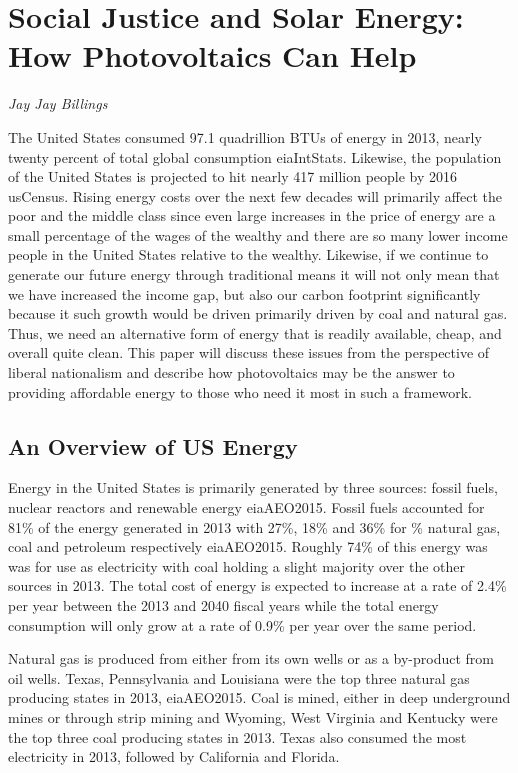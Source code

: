 \section{Social Justice and Solar Energy: How Photovoltaics Can Help}
\textit{Jay Jay Billings}

The United States consumed 97.1 quadrillion BTUs of energy in 2013, nearly 
twenty percent of total global consumption \cite{jay}{eiaIntStats}. Likewise, the 
population of the United States is projected to hit nearly 417 million people 
by 2016 \cite{jay}{usCensus}. Rising energy costs over the next few decades will 
primarily affect the poor and the middle class since even large increases in 
the price of energy are a small percentage of the wages of the wealthy and 
there are so many lower income people in the United States relative to the 
wealthy. Likewise, if we continue to generate our future energy through 
traditional means it will not only mean that we have increased the income gap, 
but also our carbon footprint significantly because it such growth would be 
driven primarily driven by coal and natural gas. Thus, we need an alternative 
form of energy that is readily available, cheap, and overall quite clean. This 
paper will discuss these issues from the perspective of liberal nationalism and 
describe how photovoltaics may be the answer to providing affordable energy to 
those who need it most in such a framework.

\subsection{An Overview of US Energy}

Energy in the United States is primarily generated by three sources: fossil 
fuels, nuclear reactors and renewable energy \cite{jay}{eiaAEO2015}. Fossil fuels 
accounted for 81\% of the energy generated in 2013 with 27\%, 18\% and 36\% for 
\% natural gas, coal and petroleum respectively \cite{jay}{eiaAEO2015}. Roughly 74\%
of this energy was was for use as electricity with coal holding a slight 
majority over the other sources in 2013. The total cost of energy is expected 
to increase at a rate of 2.4\% per year between the 2013 and 2040 fiscal years 
while the total energy consumption will only grow at a rate of 0.9\% per year 
over the same period.

Natural gas is produced from either from its own wells or as a by-product from 
oil wells. Texas, Pennsylvania and Louisiana were the top three natural gas 
producing states in 2013, \cite{jay}{eiaAEO2015}. Coal is mined, either in deep 
underground mines or through strip mining and Wyoming, West Virginia and Kentucky 
were the top three coal producing states in 2013. Texas also consumed the most 
electricity in 2013, followed by California and Florida.

